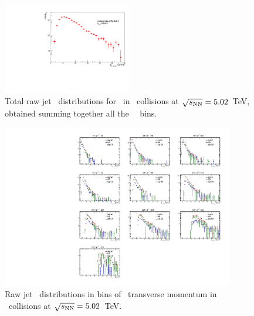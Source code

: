 \begin{figure}[bth]
\centering
\includegraphics[width=0.5\textwidth]{pPbplots/plotsSB_noEff_pt3_noDetails/jetPtSpectrum_SB_FASTwoSDD_pTD3}
\caption{Total raw jet \pt\ distributions for \Dstar\ in \pPb\ collisions at $\sqrt{s_{\rm NN}}=5.02$~TeV, obtained summing together all the \Dstar\ \pt\ bins.}
\label{fig:eq_pPb_signBkgJet_tot_Dstar}
\end{figure}

\begin{figure}[bth]
\centering
\includegraphics[width=0.9\textwidth]{pPbplotsD0/Default/signalExtraction/plots/jetRawSpectrum_LHC16R03_pTD3.pdf}
\caption{Raw jet \pt\ distributions in bins of \Dzero\ transverse momentum in \pPb\ collisions at $\sqrt{s_{\rm NN}}=5.02$~TeV.}
\label{fig:eq_pPb_signBkgJet_Dzero_Dbins}
\end{figure}


